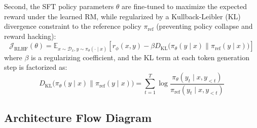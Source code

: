 \documentclass{article}
\begin{document}
Second, the SFT policy parameters $\theta$ are fine-tuned to maximize the expected reward under the learned RM, while regularized by a Kullback-Leibler (KL) divergence constraint to the reference policy $\pi_{\text{ref}}$ (preventing policy collapse and reward hacking):
\begin{equation}
  \mathcal{J}_{\text{RLHF}}(\theta) = \mathbb{E}_{x \sim \mathcal{D}_x, y \sim \pi_\theta(\cdot \mid x)} \left[ r_\phi(x, y) - \beta D_{\text{KL}}\bigl( \pi_\theta(y \mid x) \parallel \pi_{\text{ref}}(y \mid x) \bigr) \right]
\end{equation}
where $\beta$ is a regularizing coefficient, and the KL term at each token generation step is factorized as:
\begin{equation}
  D_{\text{KL}}\bigl( \pi_\theta(y \mid x) \parallel \pi_{\text{ref}}(y \mid x) \bigr) = \sum_{t=1}^T \log \frac{\pi_\theta(y_t \mid x, y_{<t})}{\pi_{\text{ref}}(y_t \mid x, y_{<t})}
\end{equation}

\subsection{Architecture Flow Diagram}
\end{document}
